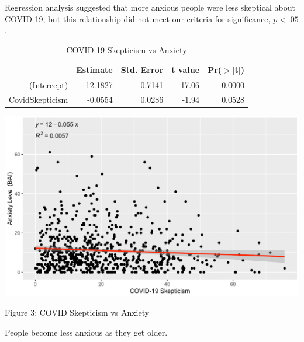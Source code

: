 \documentclass{article}
\begin{document}
\vspace*{\fill}

\pagebreak

\vspace*{\fill}

\noindent
Regression analysis suggested that more anxious people were less skeptical about COVID-19, but this relationship did not meet our criteria for significance, $p < .05$.

\begin{table}[ht]
\centering
\caption{COVID-19 Skepticism vs Anxiety} \label{tab:title}
\begin{tabular}{rrrrr}
  \hline
 & Estimate & Std. Error & t value & Pr($>$$|$t$|$) \\ 
  \hline
(Intercept) & 12.1827 & 0.7141 & 17.06 & 0.0000 \\ 
  CovidSkepticism & -0.0554 & 0.0286 & -1.94 & 0.0528 \\ 
   \hline
\end{tabular}
\end{table}

\bigskip
\bigskip
\bigskip
\bigskip
\bigskip

{\centering \includegraphics[scale=0.6]{BAICOVIDgraph.png} \par}

{\centering Figure 3: COVID Skepticism vs Anxiety \par}

\vspace*{\fill}

\pagebreak

\vspace*{\fill}

\noindent
People become less anxious as they get older.
\end{document}
